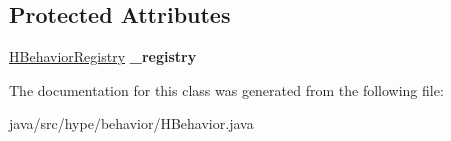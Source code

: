 \subsection*{Protected Attributes}
\begin{DoxyCompactItemize}
\item 
\hypertarget{classhype_1_1behavior_1_1_h_behavior_acc5aa852c9e6cdd3bc457298743c0082}{\hyperlink{classhype_1_1behavior_1_1_h_behavior_registry}{H\-Behavior\-Registry} {\bfseries \-\_\-registry}}\label{classhype_1_1behavior_1_1_h_behavior_acc5aa852c9e6cdd3bc457298743c0082}

\end{DoxyCompactItemize}


The documentation for this class was generated from the following file\-:\begin{DoxyCompactItemize}
\item 
java/src/hype/behavior/H\-Behavior.\-java\end{DoxyCompactItemize}
